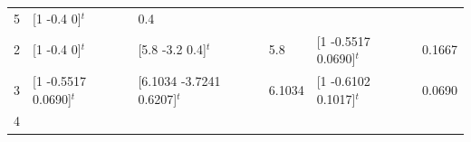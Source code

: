 \documentclass[openany]{book}
\begin{document}
\begin{longtable}[]{@{}llllll@{}}
\begin{minipage}[t]{0.05\columnwidth}
5\strut
\end{minipage} & \begin{minipage}[t]{0.27\columnwidth}\raggedright
{[}1 -0.4 0{]}\(^t\)\strut
\end{minipage} & \begin{minipage}[t]{0.09\columnwidth}\raggedright
0.4\strut
\end{minipage}\tabularnewline
\begin{minipage}[t]{0.03\columnwidth}\raggedright
2\strut
\end{minipage} & \begin{minipage}[t]{0.20\columnwidth}\raggedright
{[}1 -0.4 0{]}\(^t\)\strut
\end{minipage} & \begin{minipage}[t]{0.20\columnwidth}\raggedright
{[}5.8 -3.2 0.4{]}\(^t\)\strut
\end{minipage} & \begin{minipage}[t]{0.05\columnwidth}\raggedright
5.8\strut
\end{minipage} & \begin{minipage}[t]{0.27\columnwidth}\raggedright
{[}1 -0.5517 0.0690{]}\(^t\)\strut
\end{minipage} & \begin{minipage}[t]{0.09\columnwidth}\raggedright
0.1667\strut
\end{minipage}\tabularnewline
\begin{minipage}[t]{0.03\columnwidth}\raggedright
3\strut
\end{minipage} & \begin{minipage}[t]{0.20\columnwidth}\raggedright
{[}1 -0.5517 0.0690{]}\(^t\)\strut
\end{minipage} & \begin{minipage}[t]{0.20\columnwidth}\raggedright
{[}6.1034 -3.7241 0.6207{]}\(^t\)\strut
\end{minipage} & \begin{minipage}[t]{0.05\columnwidth}\raggedright
6.1034\strut
\end{minipage} & \begin{minipage}[t]{0.27\columnwidth}\raggedright
{[}1 -0.6102 0.1017{]}\(^t\)\strut
\end{minipage} & \begin{minipage}[t]{0.09\columnwidth}\raggedright
0.0690\strut
\end{minipage}\tabularnewline
\begin{minipage}[t]{0.03\columnwidth}\raggedright
4\strut
\end{minipage} & \begin{minipage}[t]{0.20\columnwidth}\raggedright

\end{minipage}
\end{longtable}
\end{document}
